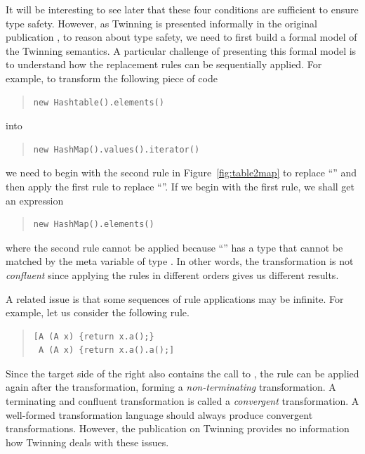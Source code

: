 It will be interesting to see later that these four conditions are
sufficient to ensure type safety. However, as Twinning is presented
informally in the original publication \cite{twinning}, to reason about
type safety,
we need to first build a formal model of the Twinning semantics. A
particular challenge of presenting this formal model is to understand
how the replacement rules can be sequentially applied. For example, to
transform the following piece of code
\begin{quote}
\begin{lstlisting}
new Hashtable().elements()
\end{lstlisting}
\end{quote}
into
\begin{quote}
\begin{lstlisting}
new HashMap().values().iterator()
\end{lstlisting}
\end{quote}
we need to begin with the second rule in
Figure~\ref{fig:table2map} to replace ``'' and then apply
the first rule to replace ``''. If we begin with the
first rule, we shall get an expression
\begin{quote}
\begin{lstlisting}
new HashMap().elements()
\end{lstlisting}
\end{quote}
where the second rule cannot be applied because ``'' has a type  that cannot be matched by the meta
variable  of type . In other words, the
transformation is not \emph{confluent} since applying the rules in
different orders gives us different results.

A related issue is that some sequences of rule applications may be
infinite. For example, let us consider the following rule.
\begin{quote}
\begin{lstlisting}
[A (A x) {return x.a();} 
 A (A x) {return x.a().a();]
\end{lstlisting}
\end{quote}
Since the target side of the right also contains the call to
, the rule can be applied again after the transformation,
forming a \emph{non-terminating} transformation.
A terminating and confluent transformation is called a {\em
  convergent} transformation.
A well-formed transformation language should always produce 
convergent transformations. 
However, the publication on Twinning
\cite{twinning} provides no information how Twinning deals with these
issues.

